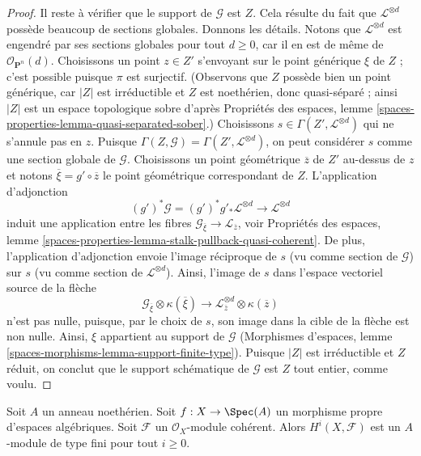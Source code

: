 \begin{proof}
\medskip\noindent
Il reste à vérifier que le support de $\mathcal{G}$ est $Z$.
Cela résulte du fait que $\mathcal{L}^{\otimes d}$ possède
beaucoup de sections globales. Donnons les détails.
Notons que $\mathcal{L}^{\otimes d}$ est engendré par ses sections globales pour tout $d \geq 0$,
car il en est de même de $\mathcal{O}_{\mathbf{P}^n}(d)$.
Choisissons un point $z \in Z'$ s'envoyant sur le point générique $\xi$ de $Z$ ;
c'est possible puisque $\pi$ est surjectif.
(Observons que $Z$ possède bien un point générique, car $|Z|$ est irréductible
et $Z$ est noethérien, donc quasi-séparé ; ainsi $|Z|$ est un espace topologique
sobre d'après
Propriétés des espaces, lemme
\ref{spaces-properties-lemma-quasi-separated-sober}.)
Choisissons $s \in \Gamma(Z', \mathcal{L}^{\otimes d})$ qui ne s'annule pas en $z$.
Puisque $\Gamma(Z, \mathcal{G}) = \Gamma(Z', \mathcal{L}^{\otimes d})$,
on peut considérer $s$ comme une section globale de $\mathcal{G}$.
Choisissons un point géométrique $\overline{z}$ de $Z'$ au-dessus de $z$
et notons $\overline{\xi} = g' \circ \overline{z}$
le point géométrique correspondant de $Z$. L'application d'adjonction
$$
(g')^*\mathcal{G} =
(g')^*g'_*\mathcal{L}^{\otimes d} \longrightarrow \mathcal{L}^{\otimes d}
$$
induit une application entre les fibres
$\mathcal{G}_{\overline{\xi}} \to \mathcal{L}_{\overline{z}}$, voir
Propriétés des espaces, lemme
\ref{spaces-properties-lemma-stalk-pullback-quasi-coherent}.
De plus, l'application d'adjonction envoie l'image réciproque de $s$ (vu comme section
de $\mathcal{G}$) sur $s$ (vu comme section de $\mathcal{L}^{\otimes d}$).
Ainsi, l'image de $s$ dans l'espace vectoriel source de la flèche
$$
\mathcal{G}_{\overline{\xi}} \otimes \kappa(\overline{\xi})
\longrightarrow
\mathcal{L}^{\otimes d}_{\overline{z}} \otimes \kappa(\overline{z})
$$
n'est pas nulle, puisque, par le choix de $s$, son image dans la cible de la flèche
est non nulle. Ainsi, $\xi$ appartient au support de $\mathcal{G}$
(Morphismes d'espaces, lemme \ref{spaces-morphisms-lemma-support-finite-type}).
Puisque $|Z|$ est irréductible et $Z$ réduit, on conclut que
le support schématique de $\mathcal{G}$ est $Z$ tout entier, comme voulu.
\end{proof}

\begin{lemma}
\label{lemma-proper-over-affine-cohomology-finite}
Soit $A$ un anneau noethérien.
Soit $f : X \to \Spec(A)$ un morphisme propre d'espaces algébriques.
Soit $\mathcal{F}$ un $\mathcal{O}_X$-module cohérent.
Alors $H^i(X, \mathcal{F})$ est un $A$-module de type fini pour tout $i \geq 0$.
\end{lemma}

